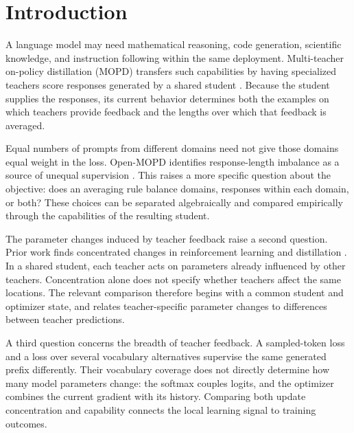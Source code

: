 \section{Introduction}
\label{sec:intro}

A language model may need mathematical reasoning, code generation, scientific knowledge, and instruction following within the same deployment. Multi-teacher on-policy distillation (MOPD) transfers such capabilities by having specialized teachers score responses generated by a shared student \citep{ma2026mopdmultiteacheronpolicydistillation}. Because the student supplies the responses, its current behavior determines both the examples on which teachers provide feedback and the lengths over which that feedback is averaged.

Equal numbers of prompts from different domains need not give those domains equal weight in the loss. Open-MOPD identifies response-length imbalance as a source of unequal supervision \citep{gao2026openmopddiagnosingfixingcapability}. This raises a more specific question about the objective: does an averaging rule balance domains, responses within each domain, or both? These choices can be separated algebraically and compared empirically through the capabilities of the resulting student.

The parameter changes induced by teacher feedback raise a second question. Prior work finds concentrated changes in reinforcement learning \citep{mukherjee2025subnetworks} and distillation \citep{yu2026denseupdates,shen2026opdgeometry}. In a shared student, each teacher acts on parameters already influenced by other teachers. Concentration alone does not specify whether teachers affect the same locations. The relevant comparison therefore begins with a common student and optimizer state, and relates teacher-specific parameter changes to differences between teacher predictions.

A third question concerns the breadth of teacher feedback. A sampled-token loss and a loss over several vocabulary alternatives supervise the same generated prefix differently. Their vocabulary coverage does not directly determine how many model parameters change: the softmax couples logits, and the optimizer combines the current gradient with its history. Comparing both update concentration and capability connects the local learning signal to training outcomes.

